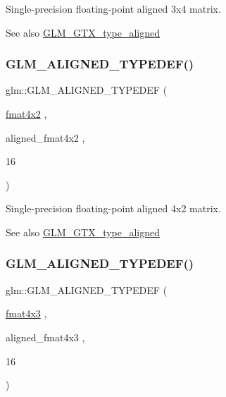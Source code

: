 Single-\/precision floating-\/point aligned 3x4 matrix. \begin{DoxySeeAlso}{See also}
\mbox{\hyperlink{group__gtx__type__aligned}{G\+L\+M\+\_\+\+G\+T\+X\+\_\+type\+\_\+aligned}} 
\end{DoxySeeAlso}
\mbox{\label{group__gtx__type__aligned_ga93f09768241358a287c4cca538f1f7e7}} 
\subsubsection{\texorpdfstring{GLM\_ALIGNED\_TYPEDEF()}{GLM\_ALIGNED\_TYPEDEF()}\hspace{0.1cm}{\footnotesize\ttfamily [178/209]}}
{\footnotesize\ttfamily glm\+::\+G\+L\+M\+\_\+\+A\+L\+I\+G\+N\+E\+D\+\_\+\+T\+Y\+P\+E\+D\+EF (\begin{DoxyParamCaption}\item[{\mbox{\hyperlink{group__gtc__type__precision_ga9325d382b334066a4c90a814c9040359}{fmat4x2}}}]{,  }\item[{aligned\+\_\+fmat4x2}]{,  }\item[{16}]{ }\end{DoxyParamCaption})}

Single-\/precision floating-\/point aligned 4x2 matrix. \begin{DoxySeeAlso}{See also}
\mbox{\hyperlink{group__gtx__type__aligned}{G\+L\+M\+\_\+\+G\+T\+X\+\_\+type\+\_\+aligned}} 
\end{DoxySeeAlso}
\mbox{\label{group__gtx__type__aligned_ga7c117e3ecca089e10247b1d41d88aff9}} 
\subsubsection{\texorpdfstring{GLM\_ALIGNED\_TYPEDEF()}{GLM\_ALIGNED\_TYPEDEF()}\hspace{0.1cm}{\footnotesize\ttfamily [179/209]}}
{\footnotesize\ttfamily glm\+::\+G\+L\+M\+\_\+\+A\+L\+I\+G\+N\+E\+D\+\_\+\+T\+Y\+P\+E\+D\+EF (\begin{DoxyParamCaption}\item[{\mbox{\hyperlink{group__gtc__type__precision_ga89195b7b13a41b0f1d34a962d1f66bfb}{fmat4x3}}}]{,  }\item[{aligned\+\_\+fmat4x3}]{,  }\item[{16}]{ }\end{DoxyParamCaption})}

